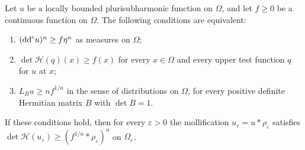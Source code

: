 \begin{proposition}\label{prop:bounded-monge-ampere-linear-density}
Let $u$ be a locally bounded plurisubharmonic function on $\Omega$, and let $f\ge0$ be a continuous function on $\Omega$. The following conditions are equivalent:
\begin{enumerate}
\item $(\mathrm{dd}^{\mathrm{c}} u)^n\ge f\eta^n$ as measures on $\Omega$;
\item $\det\mathcal H(q)(x)\ge f(x)$ for every $x\in\Omega$ and every upper test function $q$ for $u$ at $x$;
\item $L_Bu\ge nf^{1/n}$ in the sense of distributions on $\Omega$, for every positive definite Hermitian matrix $B$ with $\det B=1$.
\end{enumerate}
If these conditions hold, then for every $\varepsilon>0$ the mollification $u_\varepsilon=u*\rho_\varepsilon$ satisfies $\det\mathcal H(u_\varepsilon)\ge(f^{1/n}*\rho_\varepsilon)^n$ on $\Omega_\varepsilon$.
\end{proposition}
